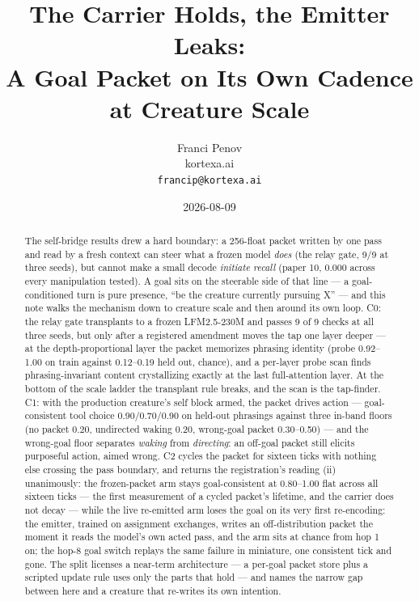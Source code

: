 \documentclass[11pt]{article}
\title{The Carrier Holds, the Emitter Leaks:\\A Goal Packet on Its Own Cadence\\at Creature Scale}
\author{Franci Penov \\ kortexa.ai \\ \texttt{francip@kortexa.ai}}
\date{2026-08-09}
\begin{document}
\maketitle

\begin{abstract}
The self-bridge results drew a hard boundary: a 256-float packet written
by one pass and read by a fresh context can steer what a frozen model
\emph{does} (the relay gate, 9/9 at three seeds), but cannot make a
small decode \emph{initiate recall} (paper 10, 0.000 across every
manipulation tested). A goal sits on the steerable side of that line ---
a goal-conditioned turn is pure presence, ``be the creature currently
pursuing X'' --- and this note walks the mechanism down to creature scale
and then around its own loop. C0: the relay gate transplants to a frozen
LFM2.5-230M and passes 9 of 9 checks at all three seeds, but only after a
registered amendment moves the tap one layer deeper --- at the
depth-proportional layer the packet memorizes phrasing identity (probe
0.92--1.00 on train against 0.12--0.19 held out, chance),
and a per-layer probe scan finds phrasing-invariant content
crystallizing exactly at the last full-attention layer. At the bottom of
the scale ladder the transplant rule breaks, and the scan is the
tap-finder. C1: with the production creature's self block armed, the
packet drives action --- goal-consistent tool choice 0.90/0.70/0.90 on
held-out phrasings against three in-band floors (no packet 0.20,
undirected waking 0.20, wrong-goal packet 0.30--0.50) --- and the
wrong-goal floor separates \emph{waking} from \emph{directing}: an
off-goal packet still elicits purposeful action, aimed wrong. C2 cycles
the packet for sixteen ticks with nothing else crossing the pass
boundary, and returns the registration's reading (ii) unanimously: the
frozen-packet arm stays goal-consistent at
0.80--1.00 flat across all sixteen ticks --- the first
measurement of a cycled packet's lifetime, and the carrier does not decay
--- while the live re-emitted arm loses the goal on its very first
re-encoding: the emitter, trained on assignment exchanges, writes an
off-distribution packet the moment it reads the model's own acted pass,
and the arm sits at chance from hop 1 on; the hop-8 goal switch replays
the same failure in miniature, one consistent tick and gone. The split
licenses a near-term architecture --- a per-goal packet store plus a
scripted update rule uses only the parts that hold --- and names the
narrow gap between here and a creature that re-writes its own intention.
\end{abstract}
\end{document}
